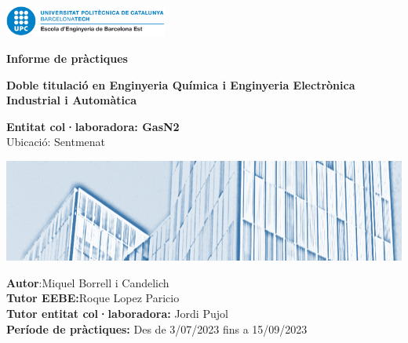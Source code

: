 \begin{titlepage}

\includegraphics[width=0.4\textwidth]{LogoUPC.png}
\begin{center}
       \vspace*{1cm}

       \textbf{Informe de pràctiques}

       \vspace{0.5cm}
        \textbf{Doble titulació en Enginyeria Química i Enginyeria Electrònica Industrial i Automàtica}\\
            
       \vspace{1.5cm}

       \textbf{Entitat col·laboradora: GasN2}\\
       Ubicació: Sentmenat\\

\end{center}
\includegraphics[]{BannerEEBE.png}
       
       \vfill
\textbf{Autor}:Miquel Borrell i Candelich\\
\textbf{Tutor EEBE:}Roque Lopez Paricio\\
\textbf{Tutor entitat col·laboradora:} Jordi Pujol\\
\textbf{Període de pràctiques:} Des de 3/07/2023 fins a 15/09/2023\\
            
       \vspace{0.8cm}
            
\end{titlepage}